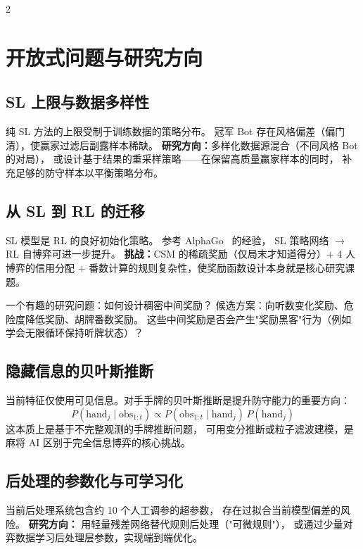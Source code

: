 \documentclass{article}
\begin{document}
\begin{multicols}{2}
\section{开放式问题与研究方向}
\label{sec:open}

\subsection{SL 上限与数据多样性}

纯 SL 方法的上限受制于训练数据的策略分布。
冠军 Bot 存在风格偏差（偏门清），使赢家过滤后副露样本稀缺。
\textbf{研究方向：}多样化数据源混合（不同风格 Bot 的对局），
或设计基于结果的重采样策略——在保留高质量赢家样本的同时，
补充足够的防守样本以平衡策略分布。

\subsection{从 SL 到 RL 的迁移}

SL 模型是 RL 的良好初始化策略。
参考 AlphaGo~\cite{silver2016mastering} 的经验，
SL 策略网络 $\to$ RL 自博弈可进一步提升。
\textbf{挑战：}CSM 的稀疏奖励（仅局末才知道得分）$+$ 4 人博弈的信用分配
$+$ 番数计算的规则复杂性，使奖励函数设计本身就是核心研究课题。

一个有趣的研究问题：如何设计稠密中间奖励？
候选方案：向听数变化奖励、危险度降低奖励、胡牌番数奖励。
这些中间奖励是否会产生"奖励黑客"行为（例如学会无限循环保持听牌状态）？

\subsection{隐藏信息的贝叶斯推断}

当前特征仅使用可见信息。对手手牌的贝叶斯推断是提升防守能力的重要方向：
\begin{equation}
P(\text{hand}_j \mid \text{obs}_{1:t})
\propto P(\text{obs}_{1:t} \mid \text{hand}_j)\, P(\text{hand}_j)
\end{equation}
这本质上是基于不完整观测的手牌推断问题，
可用变分推断或粒子滤波建模，是麻将 AI 区别于完全信息博弈的核心挑战。

\subsection{后处理的参数化与可学习化}

当前后处理系统包含约 10 个人工调参的超参数，
存在过拟合当前模型偏差的风险。
\textbf{研究方向：}
用轻量残差网络替代规则后处理（"可微规则"），
或通过少量对弈数据学习后处理层参数，实现端到端优化。


\end{multicols}
\end{document}
